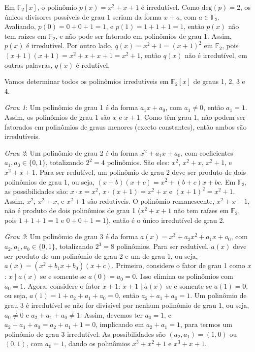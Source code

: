 \begin{example}
  Em $\mathbb{F}_2[x]$, o polinômio $p(x) = x^2 + x + 1$ é irredutível. Como
  $\text{deg}(p) = 2$, os únicos divisores possíveis de grau 1 seriam da forma
  $x + a$, com $a \in \mathbb{F}_2$. Avaliando, $p(0) = 0 + 0 + 1 = 1$, e
  $p(1) = 1 + 1 + 1 = 1$, então $p(x)$ não tem raízes em $\mathbb{F}_2$, e não pode
  ser fatorado em polinômios de grau 1. Assim, $p(x)$ é irredutível. Por outro
  lado, $q(x) = x^2 + 1 = (x + 1)^2$ em $\mathbb{F}_2$, pois
  $(x + 1)(x + 1) = x^2 + x + x + 1 = x^2 + 1$, então $q(x)$ não é irredutível, em
  outras palavras, $q(x)$ é redutível.
\end{example}





\begin{example}
  Vamos determinar todos os polinômios irredutíveis em $\mathbb{F}_2[x]$ de graus
  1, 2, 3 e 4.

  \emph{Grau 1}: Um polinômio de grau 1 é da forma $a_1 x + a_0$, com
  $a_1 \neq 0$, então $a_1 = 1$. Assim, os polinômios de grau 1 são $x$ e $x + 1$.
  Como têm grau 1, não podem ser fatorados em polinômios de graus menores (exceto
  constantes), então ambos são irredutíveis.

  \emph{Grau 2}: Um polinômio de grau 2 é da forma $x^2 + a_1 x + a_0$, com
  coeficientes $a_1, a_0 \in \{0, 1\}$, totalizando $2^2 = 4$ polinômios. 
  São eles: $x^2$, $x^2 + x$, $x^2 + 1$, e $x^2 + x + 1$.
  Para ser redutível, um polinômio de grau 2
  deve ser produto de dois polinômios de grau 1, ou seja, $(x + b)(x + c) = x^2 + (b + c)x + bc$.
  Em $\mathbb{F}_2$, as possibilidades são: $x \cdot x = x^2$, $x \cdot (x+1) = x^2 + x$ e
  $(x+1)^2 = x^2 + 1$.
  Assim, $x^2$, $x^2 + x$, e $x^2 + 1$ são redutíveis.
  O polinômio remanescente, $x^2 + x + 1$, não é produto de dois polinômios de grau 1
  ($x^2 + x + 1$ não tem raízes em $\mathbb{F}_2$, pois $1+1+1=1$ e $0+0+1=1$),
  então é o único irredutível de grau 2.

  \emph{Grau 3}: Um polinômio de grau 3 é da forma 
  $a(x) = x^3 + a_2 x^2 + a_1 x + a_0$, com $a_2, a_1, a_0 \in \{0, 1\}$,
  totalizando $2^3 = 8$ polinômios. Para ser redutível, $a(x)$ deve ser produto
  de um polinômio de grau 2 e um de grau 1, ou seja, $a(x) = (x^2 + b_1 x + b_0)(x + c)$.
  Primeiro, considere o fator de grau 1 como $x$: $x \mid a(x)$ se e somente se $a(0) = a_0 = 0$.
  Isso elimina os polinômios com $a_0 = 1$. Agora, considere o fator $x + 1$: $x + 1 \mid a(x)$
  se e somente se $a(1) = 0$, ou seja, $a(1) = 1 + a_2 + a_1 + a_0 = 0$, então
  $a_2 + a_1 + a_0 = 1$. Um polinômio de grau 3 é irredutível se não for divisível
  por nenhum polinômio de grau 1, ou seja, $a_0 \neq 0$ e $a_2 + a_1 + a_0 \neq 1$. Assim, devemos ter
  $a_0 = 1$, e $a_2 + a_1 + a_0 = a_2 + a_1 + 1 = 0$, implicando em $a_2 + a_1 = 1$, para
  termos um polinômio de grau 3 irredutível. As possibilidades são
  $(a_2, a_1) = (1, 0)$ ou $(0, 1)$, com $a_0 = 1$,
  dando os polinômios $x^3 + x^2 + 1$ e $x^3 + x + 1$.


\end{example}
